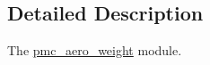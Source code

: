 \subsection{Detailed Description}
The \mbox{\hyperlink{namespacepmc__aero__weight}{pmc\+\_\+aero\+\_\+weight}} module. 

